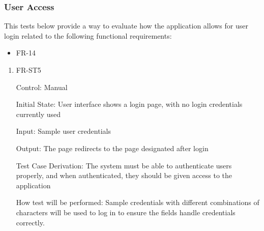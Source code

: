 \documentclass[12pt, titlepage]{article}
\begin{document}
          \subsubsection{User Access}
          This tests below provide a way to evaluate how the application allows
          for user login related to the following functional requirements:
          \begin{itemize}
            \item FR-14
          \end{itemize}
            \begin{enumerate}
            
              \item{FR-ST5}
              
              Control: Manual
                        
              Initial State: User interface shows a login page, with no login
              credentials currently used
                        
              Input: Sample user credentials
                        
              Output: The page redirects to the page designated after login
              
              Test Case Derivation: The system must be able to authenticate
              users properly, and when authenticated, they should be given
              access to the application
                        
              How test will be performed: Sample credentials with different
              combinations of characters will be used to log in to ensure the
              fields handle credentials correctly.  
              
              \end{enumerate}
\end{document}
